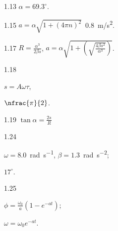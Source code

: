 \begin{Solution}{1.{13}}
		$\alpha =69.3^\circ$.
	
\end{Solution}
\begin{Solution}{1.{15}}
		$a = \alpha\sqrt{1 + (4\pi n)^2}$~0.8~m/s\textsuperscript{2}.
	
\end{Solution}
\begin{Solution}{1.{17}}
		$R = \frac{\alpha^3}{2\beta s}$, $a = \alpha\sqrt{1 + \left(\sqrt{\frac{4\beta s^2}{\alpha^3}} \right) }$.
	
\end{Solution}
\begin{Solution}{1.{18}}
		\begin{enumerate*}[label = (\alph*)]
			\item $s = A\omega \tau$,
			\item $\nfrac{\pi}{2}$.
		\end{enumerate*}
	
\end{Solution}
\begin{Solution}{1.{19}}
		$\tan\alpha = \frac{2s}{R}$
	
\end{Solution}
\begin{Solution}{1.{24}}
		\begin{enumerate*}[label = (\alph*)]
		\item $\omega = 8.0$~\si{\radian\per\second}, $\beta = 1.3$~\si{\radian\per\square\second};
		\item $17^\circ$.
		\end{enumerate*}	
	
\end{Solution}
\begin{Solution}{1.{25}}
		\begin{enumerate*}[label = (\alph*)]
			\item $\phi = \frac{\omega_0}{a}(1- e^{-at})$;
			\item $\omega = \omega_0e^{-at}$.
		\end{enumerate*}
	
\end{Solution}
